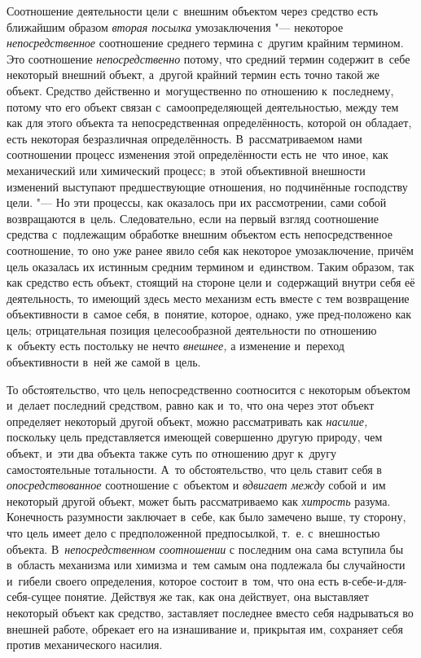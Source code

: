 Соотношение деятельности цели с~внешним объектом через
средство есть ближайшим образом {\em вторая посылка}
умозаключения "--- некоторое {\em непосредственное}
соотношение среднего термина с~другим крайним термином. Это
соотношение {\em непосредственно}
потому, что средний термин содержит в~себе некоторый внешний
объект, а~другой крайний термин есть точно такой же объект. Средство
действенно и~могущественно по отношению к~последнему, потому что его объект
связан с~самоопределяющей деятельностью, между тем как для этого объекта та
непосредственная определённость, которой он обладает, есть некоторая
безразличная определённость. В~рассматриваемом нами соотношении процесс
изменения этой определённости есть не~что иное, как механический или
химический процесс; в~этой объективной внешности изменений выступают
предшествующие отношения, но подчинённые господству цели. "---
Но эти процессы, как оказалось при их рассмотрении, сами
собой возвращаются в~цель. Следовательно, если на первый взгляд соотношение
средства с~подлежащим обработке внешним объектом есть непосредственное
соотношение, то оно уже ранее явило себя как некоторое умозаключение,
причём цель оказалась их истинным средним термином и~единством. Таким
образом, так как средство есть объект, стоящий на стороне цели и~содержащий
внутри себя её деятельность, то имеющий здесь место механизм есть вместе с
тем возвращение объективности в~самое себя, в~понятие, которое, однако, уже
пред-положено как цель; отрицательная позиция целесообразной деятельности
по отношению к~объекту есть постольку не нечто
{\em внешнее,} а
изменение и~переход объективности в~ней же самой в~цель.

То обстоятельство, что цель непосредственно соотносится с
некоторым объектом и~делает последний средством, равно как и~то, что она
через этот объект определяет некоторый другой объект, можно рассматривать
как {\em насилие,}
поскольку цель представляется имеющей совершенно другую
природу, чем объект, и~эти два объекта также суть по отношению друг к~другу
самостоятельные тотальности. А~то обстоятельство, что цель ставит себя в
{\em опосредствованное}
соотношение с~объектом и
{\em вдвигает между}
собой и~им некоторый другой объект, может быть рассматриваемо
как {\em хитрость}
разума. Конечность разумности заключает в~себе, как было
замечено выше, ту сторону, что цель имеет дело с
предположенной предпосылкой, т.~е. с~внешностью объекта.
В~{\em непосредственном соотношении}
с последним она сама вступила бы в~область механизма или
химизма и~тем самым она подлежала бы случайности и~гибели своего
определения, которое состоит в~том, что она есть в-себе-и-для-себя-сущее
понятие. Действуя же так, как она действует, она выставляет некоторый
объект как средство, заставляет последнее вместо себя надрываться во
внешней работе, обрекает его на изнашивание и, прикрытая им, сохраняет себя
против механического насилия.

